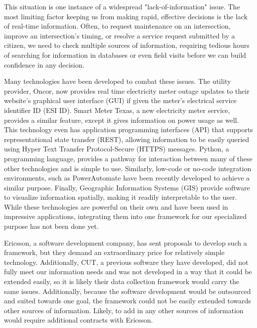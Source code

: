\documentclass[letterpaper, notitlepage]{report}
\begin{document}
This situation is one instance of a widespread "lack-of-information" issue. The most limiting factor keeping us from making rapid, effective decisions is the lack of real-time information. Often, to request maintenance on an intersection, improve an intersection's timing, or resolve a service request submitted by a citizen, we need to check multiple sources of information, requiring tedious hours of searching for information in databases or even field visits before we can build confidence in any decision. 

Many technologies have been developed to combat these issues. The utility provider, Oncor, now provides real time electricity meter outage updates to their website's graphical user interface (GUI) if given the meter's electrical service identifier ID (ESI ID). Smart Meter Texas, a new electricity meter service, provides a similar feature, except it gives information on power usage as well. This technology even has application programming interfaces (API) that supports representational state transfer (REST), allowing information to be easily queried using Hyper Text Transfer Protocol-Secure (HTTPS) messages. Python, a programming language, provides a pathway for interaction between many of these other technologies and is simple to use. Similarly, low-code or no-code integration environments, such as PowerAutomate have been recently developed to achieve a similar purpose. Finally, Geographic Information Systems (GIS) provide software to visualize information spatially, making it readily interpretable to the user. While these technologies are powerful on their own and have been used in impressive applications, integrating them into one framework for our specialized purpose has not been done yet.

Ericsson, a software development company, has sent proposals to develop such a framework, but they demand an extraordinary price for relatively simple technology. Additionally, CUT, a previous software they have developed, did not fully meet our information needs and was not developed in a way that it could be extended easily, so it is likely their data collection framework would carry the same issues. Additionally, because the software development would be outsourced and suited towards one goal, the framework could not be easily extended towards other sources of information. Likely, to add in any other sources of information would require additional contracts with Ericsson.
\end{document}
